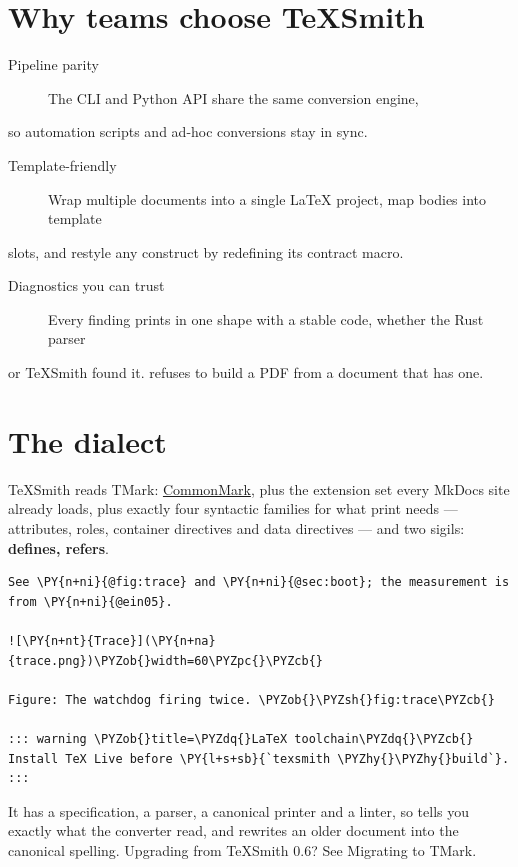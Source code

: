 \documentclass[a4paper,twoside]{article}
\begin{document}
\section{Why teams choose TeXSmith}
\begin{description}
\item[{Pipeline parity}] The CLI and Python API share the same conversion engine,
\end{description}
so automation scripts and ad-hoc conversions stay in sync.
\begin{description}
\item[{Template-friendly}] Wrap multiple documents into a single \LaTeX{} project, map bodies into template
\end{description}
slots, and restyle any construct by redefining its contract macro.
\begin{description}
\item[{Diagnostics you can trust}] Every finding prints in one shape with a stable code, whether the Rust parser
\end{description}
or TeXSmith found it.  refuses to build a
PDF from a document that has one.
\section{The dialect}
TeXSmith reads TMark: \href{https://commonmark.org/}{CommonMark},
plus the extension set every MkDocs site already loads, plus exactly four
syntactic families for what print needs --- attributes, roles, container
directives and data directives --- and two sigils: \textbf{\tscodeinline{\#} defines,  refers}.
\begin{tscode}[lang=md, engine=pygments]
\begin{Verbatim}[commandchars=\\\{\},breaklines, breakanywhere, commandchars=\\\{\}]
See \PY{n+ni}{@fig:trace} and \PY{n+ni}{@sec:boot}; the measurement is from \PY{n+ni}{@ein05}.

![\PY{n+nt}{Trace}](\PY{n+na}{trace.png})\PYZob{}width=60\PYZpc{}\PYZcb{}

Figure: The watchdog firing twice. \PYZob{}\PYZsh{}fig:trace\PYZcb{}

::: warning \PYZob{}title=\PYZdq{}LaTeX toolchain\PYZdq{}\PYZcb{}
Install TeX Live before \PY{l+s+sb}{`texsmith \PYZhy{}\PYZhy{}build`}.
:::
\end{Verbatim}
\end{tscode}
It has a specification, a parser, a canonical printer and a linter, so
 tells you exactly what the converter read, and
 rewrites an older document into the canonical spelling.
Upgrading from TeXSmith 0.6? See Migrating to TMark.
\end{document}
